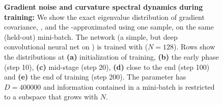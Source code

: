 \begin{figure}[!b]
  \hfill
  \begin{minipage}[t]{0.245\linewidth}
    \centering
    
  \end{minipage}
  \begin{minipage}[t]{0.245\linewidth}
    \centering
    
  \end{minipage}
  \begin{minipage}[t]{0.245\linewidth}
    \centering
    
  \end{minipage}
  \begin{minipage}[t]{0.245\linewidth}
    \centering
    
  \end{minipage}
  \hfill

  \caption{\textbf{Gradient noise and curvature spectral dynamics during
      training:} We show the exact eigenvalue distribution of gradient
    covariance, \ggn, and the \mc-approximated \ggn using one sample, on the
    same (held-out) mini-batch. The network (a simple, but deep convolutional
    neural net on \mnist) is trained with \sgd ($N=128$). Rows show the
    distributions at \textbf{(a)} initialization of training, \textbf{(b)} the
    early phase (step 10), \textbf{(c)} mid-stage (step 20), \textbf{(d)} close
    to the end (step 100) and \textbf{(e)} the end of training (step 200). The
    parameter has $D = 400 000$ and information contained in a mini-batch is
    restricted to a subspace that grows with $N$.}
  \label{fig:eigval-dynamics-during-training}
\end{figure}

